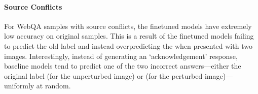 




\vspace{-2mm}
\paragraph{Source Conflicts}
For WebQA samples with source conflicts, the finetuned models have extremely low accuracy on original samples. This is a result of the finetuned models failing to predict the old label and instead overpredicting the \retlabel when presented with two images. %
Interestingly, instead of generating an `acknowledgement' response, baseline models tend to predict one of the two incorrect answers---either the original label (for the unperturbed image) or \updatedlabel (for the perturbed image)---uniformly at random. 


